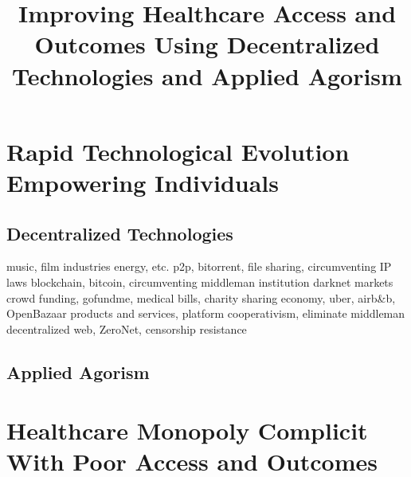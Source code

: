 \documentclass{article}
\title{Improving Healthcare Access and Outcomes Using Decentralized Technologies and Applied Agorism}
\begin{document}
\maketitle
\tableofcontents
\newpage

\section{Rapid Technological Evolution Empowering Individuals}

\subsection{Decentralized Technologies}


music, film industries
energy, etc.
p2p, bitorrent, file sharing, circumventing IP laws
blockchain, bitcoin, circumventing middleman institution
darknet markets
crowd funding, gofundme, medical bills, charity
sharing economy, uber, airb\&b, OpenBazaar products and services, platform cooperativism, eliminate middleman
decentralized web, ZeroNet, censorship resistance

\subsection{Applied Agorism}





\section{Healthcare Monopoly Complicit With Poor Access and Outcomes}
\end{document}

